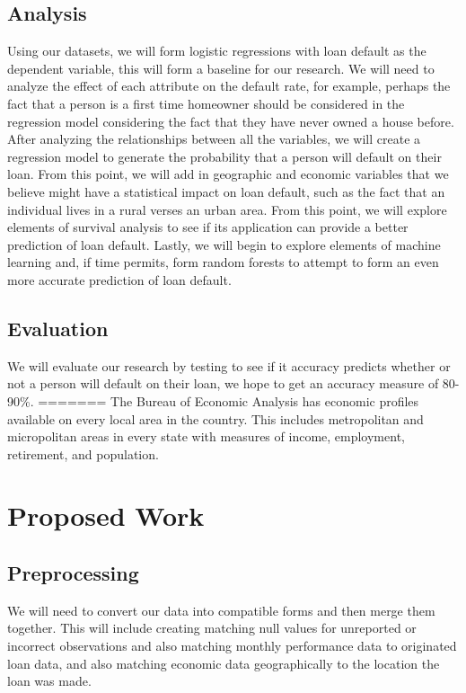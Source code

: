 \documentclass[sigconf, 11pt]{acmart}
\begin{document}
\subsection{Analysis}
Using our datasets, we will form logistic regressions with loan default as the dependent variable, this will form a baseline for our research. We will need to analyze the effect of each attribute on the default rate, for example, perhaps the fact that a person is a first time homeowner should be considered in the regression model considering the fact that they have never owned a house before. After analyzing the relationships between all the variables, we will create a regression model to generate the probability that a person will default on their loan. From this point, we will add in geographic and economic variables that we believe might have a statistical impact on loan default, such as the fact that an individual lives in a rural verses an urban area. From this point, we will explore elements of survival analysis to see if its application can provide a better prediction of loan default. Lastly, we will begin to explore elements of machine learning and, if time permits, form random forests to attempt to form an even more accurate prediction of loan default.

\subsection{Evaluation}
We will evaluate our research by testing to see if it accuracy predicts whether or not a person will default on their loan, we hope to get an accuracy measure of 80-90\%.
=======
The Bureau of Economic Analysis has economic profiles available on every local area in the country. This includes metropolitan and micropolitan areas in every state with measures of income, employment, retirement, and population. 

\section{Proposed Work}
\subsection{Preprocessing}
We will need to convert our data into compatible forms and then merge them together. This will include creating matching null values for unreported or incorrect observations and also matching monthly performance data to originated loan data, and also matching economic data geographically to the location the loan was made.
\end{document}
